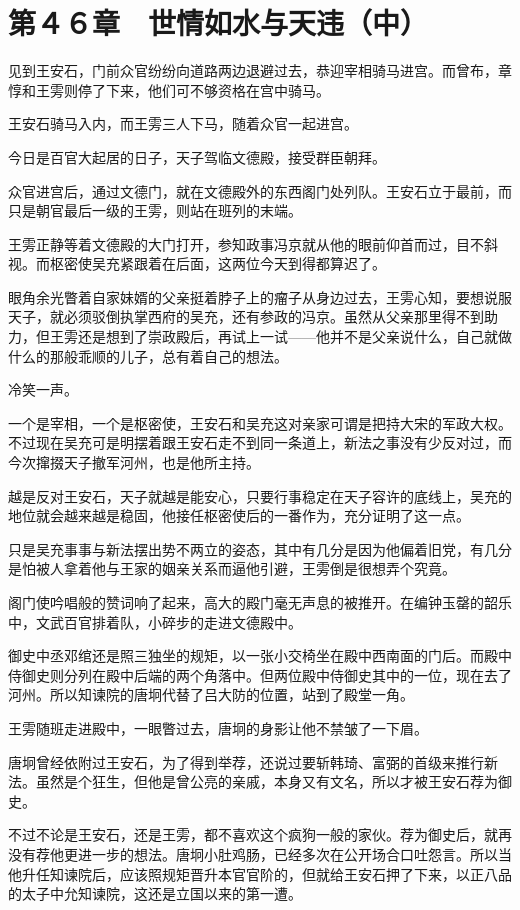 \section{第４６章　世情如水与天违（中）}

见到王安石，门前众官纷纷向道路两边退避过去，恭迎宰相骑马进宫。而曾布，章惇和王雱则停了下来，他们可不够资格在宫中骑马。

王安石骑马入内，而王雱三人下马，随着众官一起进宫。

今日是百官大起居的日子，天子驾临文德殿，接受群臣朝拜。

众官进宫后，通过文德门，就在文德殿外的东西阁门处列队。王安石立于最前，而只是朝官最后一级的王雱，则站在班列的末端。

王雱正静等着文德殿的大门打开，参知政事冯京就从他的眼前仰首而过，目不斜视。而枢密使吴充紧跟着在后面，这两位今天到得都算迟了。

眼角余光瞥着自家妹婿的父亲挺着脖子上的瘤子从身边过去，王雱心知，要想说服天子，就必须驳倒执掌西府的吴充，还有参政的冯京。虽然从父亲那里得不到助力，但王雱还是想到了崇政殿后，再试上一试——他并不是父亲说什么，自己就做什么的那般乖顺的儿子，总有着自己的想法。

冷笑一声。

一个是宰相，一个是枢密使，王安石和吴充这对亲家可谓是把持大宋的军政大权。不过现在吴充可是明摆着跟王安石走不到同一条道上，新法之事没有少反对过，而今次撺掇天子撤军河州，也是他所主持。

越是反对王安石，天子就越是能安心，只要行事稳定在天子容许的底线上，吴充的地位就会越来越是稳固，他接任枢密使后的一番作为，充分证明了这一点。

只是吴充事事与新法摆出势不两立的姿态，其中有几分是因为他偏着旧党，有几分是怕被人拿着他与王家的姻亲关系而逼他引避，王雱倒是很想弄个究竟。

阁门使吟唱般的赞词响了起来，高大的殿门毫无声息的被推开。在编钟玉罄的韶乐中，文武百官排着队，小碎步的走进文德殿中。

御史中丞邓绾还是照三独坐的规矩，以一张小交椅坐在殿中西南面的门后。而殿中侍御史则分列在殿中后端的两个角落中。但两位殿中侍御史其中的一位，现在去了河州。所以知谏院的唐坰代替了吕大防的位置，站到了殿堂一角。

王雱随班走进殿中，一眼瞥过去，唐坰的身影让他不禁皱了一下眉。

唐坰曾经依附过王安石，为了得到举荐，还说过要斩韩琦、富弼的首级来推行新法。虽然是个狂生，但他是曾公亮的亲戚，本身又有文名，所以才被王安石荐为御史。

不过不论是王安石，还是王雱，都不喜欢这个疯狗一般的家伙。荐为御史后，就再没有荐他更进一步的想法。唐坰小肚鸡肠，已经多次在公开场合口吐怨言。所以当他升任知谏院后，应该照规矩晋升本官官阶的，但就给王安石押了下来，以正八品的太子中允知谏院，这还是立国以来的第一遭。

